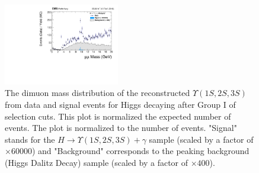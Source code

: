 \begin{figure}[!htbp]
\begin{center}
\includegraphics[width=0.45\textwidth]{figures/outputPlots/HtoUpsilon_Cat0_ZZZZZ/nEvts/data_x_mc/noKinCuts/h_noKin_Upsilon_Mass_Signal_and_Background_LargeRange}\hspace*{1.cm}
\end{center}\vspace*{-.5cm}
\caption{The dimuon mass distribution of the reconstructed $\Upsilon (1S,2S,3S)$ from data and signal events for Higgs decaying after Group I of selection cuts. This plot is normalized the expected number of events.  The plot is normalized to the number of events. "Signal" stands for the $H \rightarrow \Upsilon (1S,2S,3S) + \gamma$ sample (scaled by a factor of $\times 60000$) and "Background" corresponds to the peaking background (Higgs Dalitz Decay) sample (scaled by a factor of $\times 400$).}
\label{fig:dimuon_mass_HtoUpsilon_Cat0}
\end{figure}

